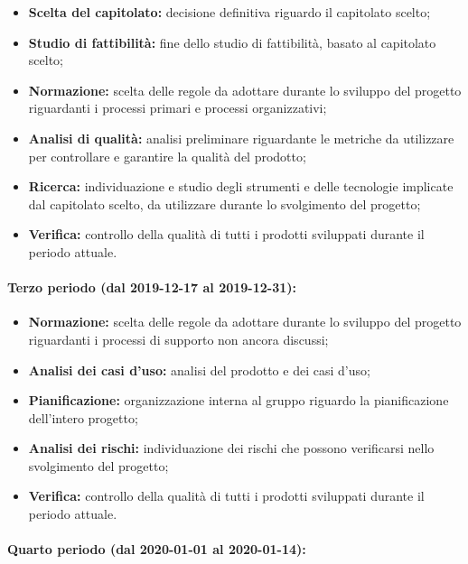 				\begin{itemize}
					\item \textbf{Scelta del capitolato:} decisione definitiva riguardo il capitolato scelto;
					\item \textbf{Studio di fattibilità:} fine dello studio di fattibilità, basato al capitolato scelto;
					\item \textbf{Normazione:} scelta delle regole da adottare durante lo sviluppo del progetto riguardanti i processi primari e processi organizzativi;
					\item \textbf{Analisi di qualità:} analisi preliminare riguardante le metriche da utilizzare per controllare e garantire la qualità del prodotto;
					\item \textbf{Ricerca:} individuazione e studio degli strumenti e delle tecnologie implicate dal capitolato scelto, da utilizzare durante lo svolgimento del progetto;
					\item \textbf{Verifica:} controllo della qualità di tutti i prodotti sviluppati durante il periodo attuale.
				\end{itemize}
			
			\paragraph{Terzo periodo (dal 2019-12-17 al 2019-12-31):}
			
				\begin{itemize}
					\item \textbf{Normazione:} scelta delle regole da adottare durante lo sviluppo del progetto riguardanti i processi di supporto non ancora discussi;
					\item \textbf{Analisi dei casi d'uso:} analisi del prodotto e dei casi d'uso;
					\item \textbf{Pianificazione:} organizzazione interna al gruppo riguardo la pianificazione dell'intero progetto;
					\item \textbf{Analisi dei rischi:} individuazione dei rischi che possono verificarsi nello svolgimento del progetto;
					\item \textbf{Verifica:} controllo della qualità di tutti i prodotti sviluppati durante il periodo attuale.
				\end{itemize}
			
			\paragraph{Quarto periodo (dal 2020-01-01 al 2020-01-14):}
			
